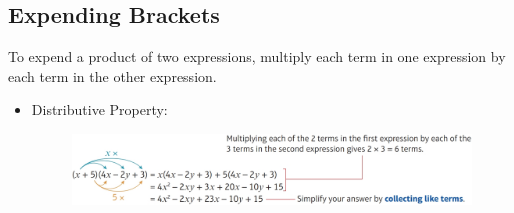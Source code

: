 
\subsection{Expending Brackets}
To expend a product of two expressions, multiply each term in one expression by each term in the other expression.
\begin{itemize}
    \item Distributive Property:
    \begin{figure}[H]
        \centering
        \includegraphics[scale=0.3]{Mathematics/Pure Mathematics/Ch1/Images/Ch1-2-1.png}
    \end{figure}
\end{itemize}